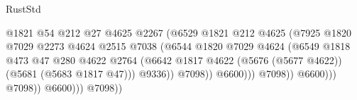 \begin{lexlean}{RustStd}
\begin{coremodule}
                                                      @1821
                                                      @54
                                                      @212
                                                      @27
                                                      @4625
                                                      @2267
                                                      (@6529
                                                        @1821
                                                        @212
                                                        @4625
                                                        (@7925
                                                          @1820
                                                          @7029
                                                          @2273
                                                          @4624
                                                          @2515
                                                          @7038
                                                          (@6544
                                                            @1820
                                                            @7029
                                                            @4624
                                                            (@6549
                                                              @1818
                                                              @473
                                                              @47
                                                              @280
                                                              @4622
                                                              @2764
                                                              (@6642
                                                                @1817
                                                                @4622
                                                                (@5676 (@5677 @4622))
                                                                (@5681 (@5683 @1817 @47)))
                                                              @9336))
                                                          @7098))
                                                      @6600)))
                                                @7098))
                                            @6600)))
                                      @7098))
                                  @6600)))
                            @7098))

\end{coremodule}
\end{lexlean}
